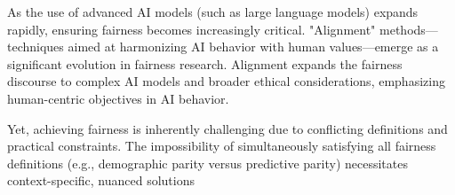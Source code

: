 As the use of advanced AI models (such as large language models) expands rapidly, ensuring fairness becomes
increasingly critical. "Alignment" methods—techniques aimed at harmonizing AI behavior with human values—emerge
as a significant evolution in fairness research. Alignment expands the fairness discourse to complex AI models
and broader ethical considerations, emphasizing human-centric objectives in AI behavior.

Yet, achieving fairness is inherently challenging due to conflicting definitions and practical constraints.
The impossibility of simultaneously satisfying all fairness definitions
(e.g., demographic parity versus predictive parity) necessitates context-specific, nuanced solutions
